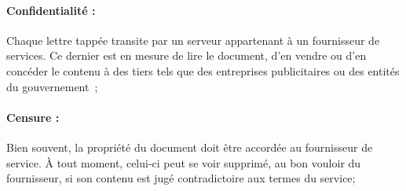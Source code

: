 

\paragraph{Confidentialité :} Chaque lettre tappée transite par un serveur
appartenant à un fournisseur de services. Ce dernier est en mesure de lire le
document, d'en vendre ou d'en concéder le contenu à des tiers tels que des
entreprises publicitaires ou des entités du gouvernement~\cite{gellman2013us,
  pearson2011toward};

\paragraph{Censure :} Bien souvent, la propriété du document doit être accordée
au fournisseur de service. À tout moment, celui-ci peut se voir supprimé, au bon
vouloir du fournisseur, si son contenu est jugé contradictoire aux termes du
service;

